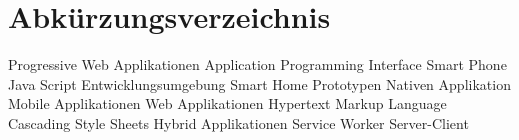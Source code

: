 \chapter*{Abkürzungsverzeichnis}
\pagestyle{plain}

\begin{acronym}[AUTOSAR]

   				{Progressive Web Applikationen}
  				{Application Programming Interface}
  				{Smart Phone}
  				{Java Script}
  				{Entwicklungsumgebung}
  				{Smart Home Prototypen}
  				{Nativen Applikation}
  				{Mobile Applikationen}
 					{Web Applikationen}
 				{Hypertext Markup Language}
 				{Cascading Style Sheets}
 				{Hybrid Applikationen}
 					{Service Worker}
 					{Server-Client}
\end{acronym}